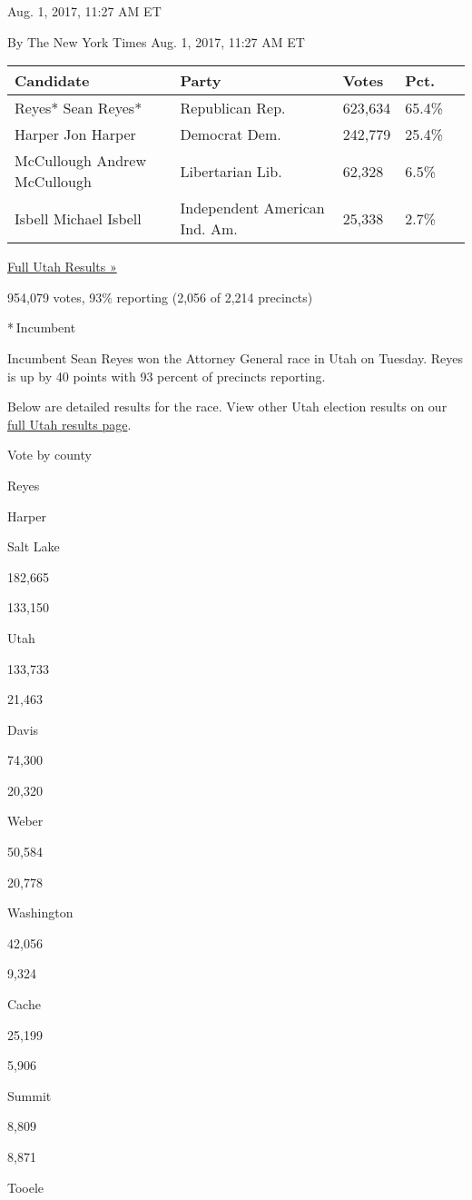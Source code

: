  Aug. 1, 2017, 11:27 AM ET

By The New York Times Aug. 1, 2017, 11:27 AM ET

\begin{longtable}[]{@{}lllll@{}}
\toprule
Candidate & Party & Votes & Pct. &\tabularnewline
\midrule
\endhead
 Reyes* Sean Reyes* & Republican Rep. & 623,634 & 65.4\%
&\tabularnewline
 Harper Jon Harper & Democrat Dem. & 242,779 & 25.4\% &\tabularnewline
 McCullough Andrew McCullough & Libertarian Lib. & 62,328 & 6.5\%
&\tabularnewline
 Isbell Michael Isbell & Independent American Ind. Am. & 25,338 & 2.7\%
&\tabularnewline
\bottomrule
\end{longtable}

\href{https://www.nytimes3xbfgragh.onion/elections/2016/results/utah}{Full
Utah Results »}

954,079 votes, 93\% reporting (2,056 of 2,214 precincts)

* Incumbent

Incumbent Sean Reyes won the Attorney General race in Utah on Tuesday.
Reyes is up by 40 points with 93 percent of precincts reporting.

Below are detailed results for the race. View other Utah election
results on our
\href{https://www.nytimes3xbfgragh.onion/elections/2016/results/utah}{full
Utah results page}.

Vote by county

Reyes

Harper

Salt Lake

182,665

133,150

Utah

133,733

21,463

Davis

74,300

20,320

Weber

50,584

20,778

Washington

42,056

9,324

Cache

25,199

5,906

Summit

8,809

8,871

Tooele

